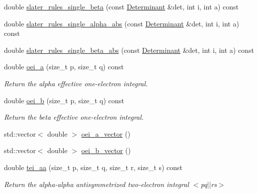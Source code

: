 \begin{DoxyCompactItemize}
\item 
double \mbox{\hyperlink{classforte_1_1_active_space_integrals_a058234ffee116c7be071ebf33d319880}{slater\+\_\+rules\+\_\+single\+\_\+beta}} (const \mbox{\hyperlink{namespaceforte_a2076c63fd7b8732004d9e1442ce527c1}{Determinant}} \&det, int i, int a) const
\item 
double \mbox{\hyperlink{classforte_1_1_active_space_integrals_abbf6bf916c0d561ce88001fed3b6967a}{slater\+\_\+rules\+\_\+single\+\_\+alpha\+\_\+abs}} (const \mbox{\hyperlink{namespaceforte_a2076c63fd7b8732004d9e1442ce527c1}{Determinant}} \&det, int i, int a) const
\item 
double \mbox{\hyperlink{classforte_1_1_active_space_integrals_a1bb5b1702ef03d473ed13f97c56af37f}{slater\+\_\+rules\+\_\+single\+\_\+beta\+\_\+abs}} (const \mbox{\hyperlink{namespaceforte_a2076c63fd7b8732004d9e1442ce527c1}{Determinant}} \&det, int i, int a) const
\item 
double \mbox{\hyperlink{classforte_1_1_active_space_integrals_a6463a779fa993faef6065c3bd3da1b1e}{oei\+\_\+a}} (size\+\_\+t p, size\+\_\+t q) const
\begin{DoxyCompactList}\small\item\em Return the alpha effective one-\/electron integral. \end{DoxyCompactList}\item 
double \mbox{\hyperlink{classforte_1_1_active_space_integrals_aee9d0ef5878d538d922f702228fc5884}{oei\+\_\+b}} (size\+\_\+t p, size\+\_\+t q) const
\begin{DoxyCompactList}\small\item\em Return the beta effective one-\/electron integral. \end{DoxyCompactList}\item 
std\+::vector$<$ double $>$ \mbox{\hyperlink{classforte_1_1_active_space_integrals_a44df304705d652eb55ee7f8d18d1202d}{oei\+\_\+a\+\_\+vector}} ()
\item 
std\+::vector$<$ double $>$ \mbox{\hyperlink{classforte_1_1_active_space_integrals_abf4ac6d3c017c227daa37406e947bbe5}{oei\+\_\+b\+\_\+vector}} ()
\item 
double \mbox{\hyperlink{classforte_1_1_active_space_integrals_a41602985b2dd4fb879c21c7aab5d558f}{tei\+\_\+aa}} (size\+\_\+t p, size\+\_\+t q, size\+\_\+t r, size\+\_\+t s) const
\begin{DoxyCompactList}\small\item\em Return the alpha-\/alpha antisymmetrized two-\/electron integral $<$pq$\vert$$\vert$rs$>$ \end{DoxyCompactList}\item 

\end{DoxyCompactItemize}
